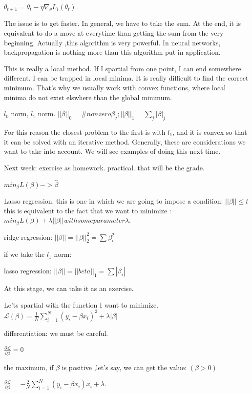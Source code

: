 \documentclass[a4paper]{tufte-book}
\begin{document}
$\theta_{t+1} = \theta_{t} - \eta \nabla_\theta L_i(\theta_{t})$.

The issue is to get faster. In general, we have to take the sum.
At the end, it is equivalent to do a move at everytime than getting the sum from
the very beginning.
Actually ,this algorithm is very powerful. In neural networks, backpropagation
is nothing more than this algorithm put in application.

This is really a local method. If I spartial from one point, I can end somewhere
different. I can be trapped in local minima. It is really difficult to find the 
correct minimum. That's why we usually work with convex functions, where local
minima do not exist elswhere than the global minimum.

$l_0$ norm, $l_1$ norm.
$||\beta||_0 = \# nonzero \beta_j ; ||\beta||_1 = \sum_j |\beta|_j$

For this reason the closest problem to the first is with $l_1$, and it is convex
so that it can be solved with an iterative method. Generally, these are
considerations we want to take into account.
We will see examples of doing this next time.

Next week: exercise as homework. practical.
that will be the grade.

$min_\beta L(\beta) -> \hat \beta$

Lasso regression.
this is one in which we are going to impose a condition:
$||\beta|| \leq t$
this is equivalent to the fact that we want to minimize :
$min_\beta L(\beta) + \lambda ||\beta|| with some parameter \lambda.$

ridge regression: $||\beta|| = ||\beta||_2^2
= \sum \beta_i^2$

if we take the $l_1$ norm:

lasso regression: $||\beta|| = ||beta||_1 = \sum |\beta_i|$

At this stage, we can take it as an exercise.

Le'ts spartial with the function I want to minimize.
$\mathcal{L} (\beta) = \frac{1}{N} \sum_{i=1}^N (y_i - \beta x_i)^2 + \lambda |\beta|$

differentiation: we must be careful.

$\frac{\partial\mathcal{L}}{\partial\beta} = 0$

the maximum, if $\beta$ is positive ,let's say, we can get the value:
$(\beta >0)$

$\frac{\partial\mathcal{L}}{\partial\beta} = - \frac{2}{N} \sum_{i=1}^N (y_i - \beta x_i)x_i + \lambda.$
\end{document}
